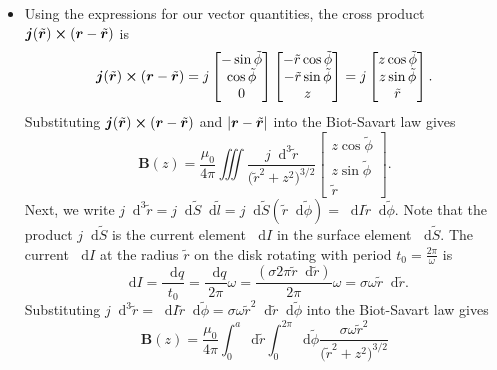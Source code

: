 \documentclass[11pt, a4paper]{article}
\newcommand{\diff}{\mathop{}\!\mathrm{d}} %
\renewcommand{\vec}[1]{\bm{#1}} %
\newcommand{\tvec}[1]{\tilde{\vec{#1}}} %
\renewcommand{\t}[1]{\tilde{#1}} %
\renewcommand{\r}{\vec{r}}
\newcommand{\B}{\vec{B}}  %
\begin{document}
\begin{itemize}
	\item Using the expressions for our vector quantities, the cross product $ \vec{j}(\tvec{r}) \cross (\r - \tvec{r}) $ is
	\begin{equation*}
		\vec{j}(\tvec{r}) \cross (\r - \tvec{r}) = j
		\begin{bmatrix}
			-\sin \t{\phi}\\
			\cos \t{\phi}\\
			0
		\end{bmatrix}
		\begin{bmatrix}
			-\tilde{r} \cos \tilde{\phi}\\
			- \tilde{r} \sin \tilde{\phi}\\
			z
		\end{bmatrix}
		= j
		\begin{bmatrix}
			z \cos \t{\phi}\\
			z \sin \t{\phi}\\
			\t{r}
		\end{bmatrix}.
	\end{equation*}
	Substituting $ \vec{j}(\tvec{r}) \cross (\r - \tvec{r}) $ and $  \abs{\r - \tvec{r}} $ into the Biot-Savart law gives
	\begin{equation*}
		\B(z) = \frac{\mu_{0}}{4 \pi} \iiint \frac{j \diff^{3} \t{r}}{\big(\tilde{r}^{2} + z^{2}\big)^{3/2}} 
		\begin{bmatrix}
			z \cos \t{\phi}\\
			z \sin \t{\phi}\\
			\t{r}
		\end{bmatrix}.
	\end{equation*}
	Next, we write $ j \diff^{3}\t{r} = j \diff \t{S} \diff \t{l} = j \diff \t{S} (\t{r} \diff \t{\phi} ) = \diff I \t{r} \diff \t{\phi} $. Note that the product $ j \diff \t{S} $ is the current element $ \diff I $ in the surface element $ \diff \tilde{S} $. The current $ \diff I $ at the radius $ \t{r} $ on the disk rotating with period $ t_{0} = \frac{2\pi}{\omega} $ is
	\begin{equation*}
		\diff I = \frac{\diff q}{t_{0}} = \frac{\diff q}{2\pi} \omega  = \frac{(\sigma 2\pi \t{r}\diff \t r)}{2\pi} \omega = \sigma \omega \t{r} \diff \t{r}.
	\end{equation*}
	Substituting $ j \diff^{3}\t{r} =  \diff I \t{r} \diff \t{\phi}  =  \sigma \omega \t{r}^{2} \diff \t{r} \diff \t{\phi}  $ into the Biot-Savart law gives
	\begin{equation*}
		\B(z) = \frac{\mu_{0}}{4 \pi} \int_{0}^{a} \diff \t{r} \int_{0}^{2\pi} \diff \t{\phi}	\frac{\sigma \omega \t{r}^{2}}{\big(\tilde{r}^{2} + z^{2}\big)^{3/2}} 

\end{equation*}
\end{itemize}
\end{document}
